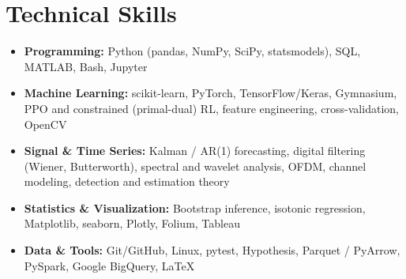 \documentclass[10pt,letterpaper]{article}
\begin{document}
\section*{Technical Skills}
\begin{itemize}\item \textbf{Programming:} Python (pandas, NumPy, SciPy, statsmodels), SQL, MATLAB, Bash, Jupyter\item \textbf{Machine Learning:} scikit-learn, PyTorch, TensorFlow/Keras, Gymnasium, PPO and constrained (primal-dual) RL, feature engineering, cross-validation, OpenCV\item \textbf{Signal \& Time Series:} Kalman / AR(1) forecasting, digital filtering (Wiener, Butterworth), spectral and wavelet analysis, OFDM, channel modeling, detection and estimation theory\item \textbf{Statistics \& Visualization:} Bootstrap inference, isotonic regression, Matplotlib, seaborn, Plotly, Folium, Tableau\item \textbf{Data \& Tools:} Git/GitHub, Linux, pytest, Hypothesis, Parquet / PyArrow, PySpark, Google BigQuery, LaTeX\end{itemize}
\end{document}
